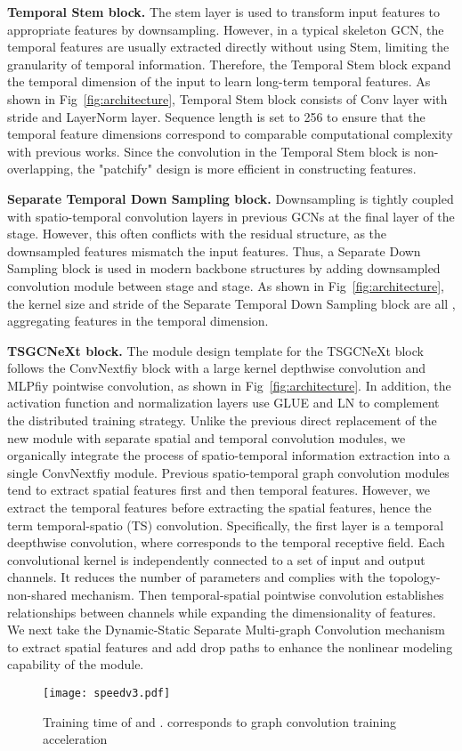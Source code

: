 \documentclass[10pt,twocolumn,letterpaper]{article}
\begin{document}
\noindent\textbf{Temporal Stem block.} The stem layer is used to transform input features to appropriate features by downsampling. However, in a typical skeleton GCN, the temporal features are usually extracted directly without using Stem, limiting the granularity of temporal information. Therefore, the Temporal Stem block expand the temporal dimension of the input to learn long-term temporal features. As shown in Fig~\ref{fig:architecture}, Temporal Stem block consists of  Conv layer with stride  and LayerNorm layer. Sequence length  is set to 256 to ensure that the temporal feature dimensions correspond to comparable computational complexity with previous works. Since the convolution in the Temporal Stem block is non-overlapping, the "patchify" design is more efficient in constructing features.

\noindent\textbf{Separate Temporal Down Sampling block.} Downsampling is tightly coupled with spatio-temporal convolution layers in previous GCNs at the final layer of the stage. However, this often conflicts with the residual structure, as the downsampled features mismatch the input features. Thus, a Separate Down Sampling block is used in modern backbone structures by adding downsampled convolution module between stage and stage. As shown in Fig~\ref{fig:architecture}, the kernel size and stride of the Separate Temporal Down Sampling block are all , aggregating features in the temporal dimension.

\noindent\textbf{TSGCNeXt block.} The module design template for the TSGCNeXt block follows the ConvNextfiy block with a large kernel depthwise convolution and MLPfiy pointwise convolution, as shown in Fig~\ref{fig:architecture}. In addition, the activation function and normalization layers use GLUE and LN to complement the distributed training strategy. Unlike the previous direct replacement of the new module with separate spatial and temporal convolution modules, we organically integrate the process of spatio-temporal information extraction into a single ConvNextfiy module. Previous spatio-temporal graph convolution modules tend to extract spatial features first and then temporal features. However, we extract the temporal features before extracting the spatial features, hence the term temporal-spatio (TS) convolution.
Specifically, the first layer is a  temporal deepthwise convolution, where  corresponds to the temporal receptive field. Each convolutional kernel is independently connected to a set of input and output channels. It reduces the number of parameters and complies with the topology-non-shared mechanism. Then  temporal-spatial pointwise convolution establishes relationships between channels while expanding the dimensionality of features. We next take the Dynamic-Static Separate Multi-graph Convolution mechanism to extract spatial features and add drop paths to enhance the nonlinear modeling capability of the module.
\begin{figure}\centering
    \texttt{[image: speedv3.pdf]}
    \caption{Training time of  and .  corresponds to graph convolution training acceleration}
    \label{fig:speed}
    \vspace{-1em}
\end{figure}
\end{document}
